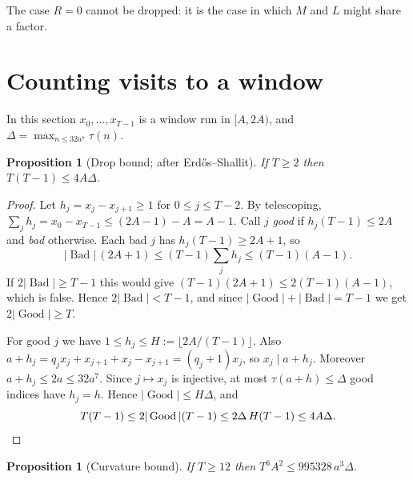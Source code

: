 \documentclass[11pt]{amsart}
\newtheorem{proposition}[theorem]{Proposition}
\theoremstyle{definition}
\theoremstyle{remark}
\DeclareMathOperator{\Good}{Good}
\DeclareMathOperator{\Bad}{Bad}
\begin{document}
The case $R=0$ cannot be dropped: it is the case in which $M$ and $L$ might share a factor.

\section{Counting visits to a window}

In this section $x_0,\dots,x_{T-1}$ is a window run in $[A,2A)$, and
$\Delta=\max_{n\le 32a^7}\tau(n)$.

\begin{proposition}[Drop bound; after Erd\H{o}s--Shallit]\label{prop:drop}
If $T\ge2$ then $T(T-1)\le 4A\Delta$.
\end{proposition}

\begin{proof}
Let $h_j=x_j-x_{j+1}\ge1$ for $0\le j\le T-2$. By telescoping,
$\sum_j h_j=x_0-x_{T-1}\le (2A-1)-A=A-1$. Call $j$ \emph{good} if $h_j(T-1)\le 2A$ and
\emph{bad} otherwise. Each bad $j$ has $h_j(T-1)\ge 2A+1$, so
\[
|\Bad|\,(2A+1)\le (T-1)\textstyle\sum_j h_j\le (T-1)(A-1).
\]
If $2|\Bad|\ge T-1$ this would give $(T-1)(2A+1)\le 2(T-1)(A-1)$, which is false. Hence
$2|\Bad|<T-1$, and since $|\Good|+|\Bad|=T-1$ we get $2|\Good|\ge T$.

For good $j$ we have $1\le h_j\le H:=\lfloor 2A/(T-1)\rfloor$. Also
$a+h_j=q_jx_j+x_{j+1}+x_j-x_{j+1}=(q_j+1)x_j$, so $x_j\mid a+h_j$. Moreover
$a+h_j\le 2a\le 32a^7$. Since $j\mapsto x_j$ is injective, at most $\tau(a+h)\le\Delta$ good
indices have $h_j=h$. Hence $|\Good|\le H\Delta$, and
\[
T(T-1)\le 2|\Good|(T-1)\le 2\Delta\,H(T-1)\le 4A\Delta. \qedhere
\]
\end{proof}

\begin{proposition}[Curvature bound]\label{prop:curv}
If $T\ge12$ then $T^6A^2\le 995328\,a^3\Delta$.
\end{proposition}
\end{document}

